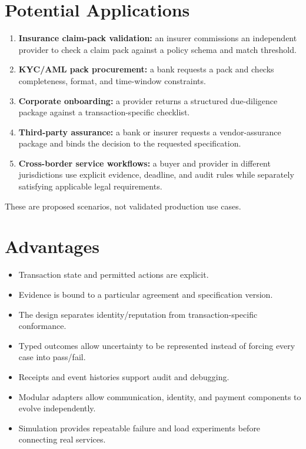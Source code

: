 \documentclass[12pt,a4paper,oneside]{report}
\begin{document}
\section{Potential Applications}
\begin{enumerate}[leftmargin=*]
\item \textbf{Insurance claim-pack validation:} an insurer commissions an independent provider to check a claim pack against a policy schema and match threshold.
\item \textbf{KYC/AML pack procurement:} a bank requests a pack and checks completeness, format, and time-window constraints.
\item \textbf{Corporate onboarding:} a provider returns a structured due-diligence package against a transaction-specific checklist.
\item \textbf{Third-party assurance:} a bank or insurer requests a vendor-assurance package and binds the decision to the requested specification.
\item \textbf{Cross-border service workflows:} a buyer and provider in different jurisdictions use explicit evidence, deadline, and audit rules while separately satisfying applicable legal requirements.
\end{enumerate}
These are proposed scenarios, not validated production use cases.

\section{Advantages}
\begin{itemize}[leftmargin=*]
\item Transaction state and permitted actions are explicit.
\item Evidence is bound to a particular agreement and specification version.
\item The design separates identity/reputation from transaction-specific conformance.
\item Typed outcomes allow uncertainty to be represented instead of forcing every case into pass/fail.
\item Receipts and event histories support audit and debugging.
\item Modular adapters allow communication, identity, and payment components to evolve independently.
\item Simulation provides repeatable failure and load experiments before connecting real services.
\end{itemize}
\end{document}
